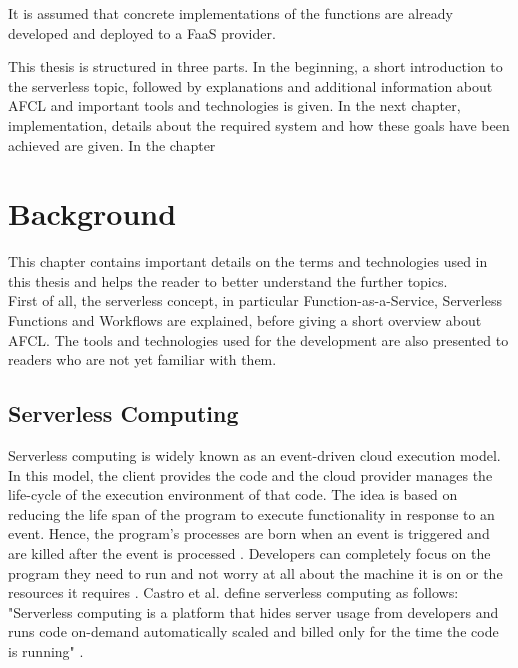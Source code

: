\documentclass[a4paper,top=25mm,bottom=25mm,12pt,pdftex,halfparskip,twoside,bibtotoc,numbers=noenddot]{scrbook}
\begin{document}

It is assumed that concrete implementations of the functions are already developed and deployed to a FaaS provider.


This thesis is structured in three parts. In the beginning, a short introduction to the serverless topic, followed by explanations and additional information about AFCL and important tools and technologies is given. In the next chapter, implementation, details about the required system and how these goals have been achieved are given. In the chapter 

\label{chap:background}
\chapter{Background}

This chapter contains important details on the terms and technologies used in this thesis and helps the reader to better understand the further topics.\\
First of all, the serverless concept, in particular Function-as-a-Service, Serverless Functions and Workflows are explained, before giving a short overview about AFCL. The tools and technologies used for the development are also presented to readers who are not yet familiar with them.

\section{Serverless Computing}

Serverless computing is widely known as an event-driven cloud execution model.
In this model, the client provides the code  and the cloud provider manages the life-cycle of the execution environment of that code.
The idea is based on reducing the life span of the program to execute functionality in response to an event. Hence, the program's processes are born when an event is triggered and are killed after the event is processed \cite{inproceedings-serverless-beyond-the-cloud-kanso}.
Developers can completely focus on the program they need to run and not worry at all about the machine it is on or the resources it requires \cite{articles-going-serverless-savage}.
Castro et al. define serverless computing as follows: "Serverless computing is a platform that hides server usage from developers and runs code on-demand automatically scaled and billed only for the time the code is running" \cite{articles-rise-of-serverless-castro}.
\end{document}

